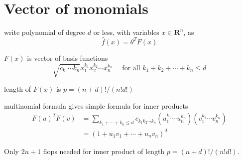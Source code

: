 \section{Vector of monomials}

\begin{definition}
    write polynomial of degree $ d $ or less, with variables $ x \in \mathbf{R}^{n} $, as
\begin{equation}
\hat{f}(x)=\theta^{T} F(x)
\end{equation}

$ F(x) $ is vector of basis functions
\begin{equation}
\sqrt{c_{k_{1}} \cdots k_{n}} x_{1}^{k_{1}} x_{2}^{k_{2}} \cdots x_{n}^{k_{n}} \quad \text { for all } k_{1}+k_{2}+\cdots+k_{n} \leq d
\end{equation}
\end{definition}

\begin{theorem}
    length of $ F(x) $ is $ p=(n+d) ! /(n ! d !) $
\end{theorem}

\begin{theorem}
    multinomial formula gives simple formula for inner products
    \begin{equation}
    \begin{aligned}
    F(u)^{T} F(v) &=\sum_{k_{1}+\cdots+k_{n} \leq d} c_{k_{1} k_{2} \cdots k_{n}}\left(u_{1}^{k_{1}} \cdots u_{n}^{k_{n}}\right)\left(v_{1}^{k_{1}} \cdots v_{n}^{k_{n}}\right) \\
    &=\left(1+u_{1} v_{1}+\cdots+u_{n} v_{n}\right)^{d}
    \end{aligned}
    \end{equation}
\end{theorem}


Only $ 2 n+1 $ flops needed for inner product of length $ p=(n+d) ! /(n ! d !) $.

